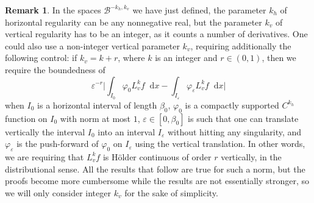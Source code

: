 \documentclass[JEP,XML,SOM,Unicode]{cedram}
\newcommand{\boB}{\mathcal{B}}
\newcommand{\dd}{\mathop{}\!\mathrm{d}}
\newcommand{\absgg}[1]{\biggl \lvert#1\biggr\rvert}
\let\epsilon\varepsilon
\let\phi\varphi
\theoremstyle{definition}
\newtheorem{rmk}[thm]{Remark}
\numberwithin{equation}{section}
\begin{document}
\begin{rmk}
\label{rmk:non_integers} In the spaces $\boB^{-k_h, k_v}$ we have just
defined, the parameter $k_h$ of horizontal regularity can be any nonnegative
real, but the parameter $k_v$ of vertical regularity has to be an integer, as
it counts a number of derivatives. One could also use a non-integer vertical
parameter $k_v$, requiring additionally the following control: if $k_v = k +
r$, where $k$ is an integer and $r\in(0,1)$, then we require the boundedness
of
\begin{equation*}
\epsilon^{-r} \absgg{\int_{I_0} \phi_0 L_v^k f \dd x -\int_{I_\epsilon} \phi_\epsilon L_v^k f \dd x}
\end{equation*}
when $I_0$ is a horizontal interval of length $\beta_0$, $\phi_0$ is a
compactly supported $C^{k_h}$ function on $I_0$ with norm at most $1$,
$\epsilon\in [0,\beta_0]$ is such that one can translate vertically the
interval $I_0$ into an interval $I_\epsilon$ without hitting any singularity,
and $\phi_\epsilon$ is the push-forward of $\phi_0$ on $I_\epsilon$ using the
vertical translation. In other words, we are requiring that $L_v^k f$ is
Hölder continuous of order $r$ vertically, in the distributional sense. All
the results that follow are true for such a norm, but the proofs become more
cumbersome while the results are not essentially stronger, so we will only
consider integer $k_v$ for the sake of simplicity.
\end{rmk}
\end{document}
